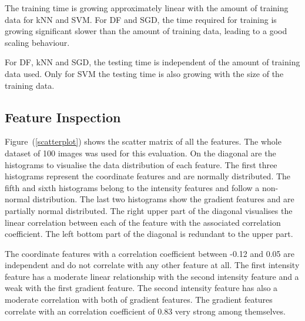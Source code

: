 \documentclass[journal]{IEEEtran}
\begin{document}
The training time is growing approximately linear with the amount of training data for kNN and SVM. For DF and SGD, the time required for training is growing significant slower than the amount of training data, leading to a good scaling behaviour.

For DF, kNN and SGD, the testing time is independent of the amount of training data used. Only for SVM the testing time is also growing with the size of the training data.

\subsection{Feature Inspection}


Figure~(\ref{scatterplot}) shows the scatter matrix of all the features. The whole dataset of 100 images was used for this evaluation. On the diagonal are the histograms to visualise the data distribution of each feature. The first three histograms represent the coordinate features and are normally distributed. The fifth and sixth histograms belong to the intensity features and follow a non-normal distribution. The last two histograms show the gradient features and are partially normal distributed. The right upper part of the diagonal visualises the linear correlation between each of the feature with the associated correlation coefficient. The left bottom part of the diagonal is redundant to the upper part. 

The coordinate features with a correlation coefficient between -0.12 and 0.05 are independent and do not correlate with any other feature at all. The first intensity feature has a moderate linear relationship with the second intensity feature and a weak with the first gradient feature. The second intensity feature has also a moderate correlation with both of gradient features. The gradient features correlate with an correlation coefficient of 0.83 very strong among themselves.
\end{document}
